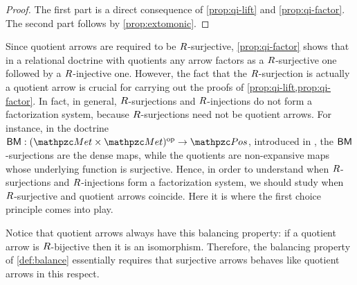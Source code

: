 \begin{proof}The first part is a direct consequence of \cref{prop:qi-lift} and \cref{prop:qi-factor}. The second part follows by \cref{prop:extomonic}.
\end{proof}


Since quotient arrows are required to be $R$-surjective, 
\cref{prop:qi-factor} shows that in a relational doctrine with quotients any arrow factors as a $R$-surjective one followed by a $R$-injective one. 
However, the fact that the $R$-surjection is actually a quotient arrow is crucial for carrying out the proofs of \cref{prop:qi-lift,prop:qi-factor}. 
 In fact, in general, $R$-surjections and $R$-injections do not form a factorization system, because $R$-surjections need not be quotient arrows. 
For instance,  in the doctrine $\fun{\BM}{\bop\Met}{\Pos}$, introduced in , the $\mathsf{BM}$-surjections are the dense maps, while the quotients are non-expansive maps whose underlying function is surjective. 
% 
Hence, in order to understand when $R$-surjections and $R$-injections form a factorization system, we should study when $R$-surjective and quotient arrows coincide. 
% 
Here it is where the first choice principle comes into play. 



 Notice that  quotient arrows always have this balancing property: 
if a quotient arrow is $R$-bijective then it is an isomorphism. 
Therefore, the balancing property of \cref{def:balance} essentially requires that surjective arrows behaves like quotient arrows in this respect. 




